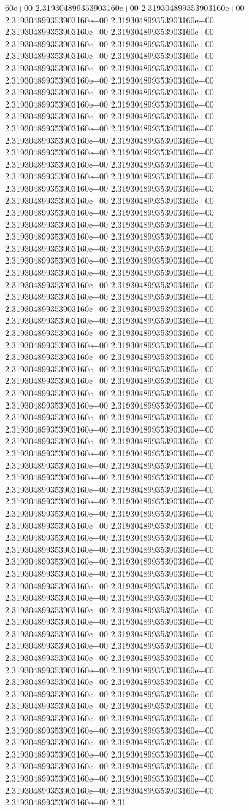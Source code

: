 60e+00	2.319304899353903160e+00	2.319304899353903160e+00	2.319304899353903160e+00	2.319304899353903160e+00	2.319304899353903160e+00	2.319304899353903160e+00	2.319304899353903160e+00	2.319304899353903160e+00	2.319304899353903160e+00	2.319304899353903160e+00	2.319304899353903160e+00	2.319304899353903160e+00	2.319304899353903160e+00	2.319304899353903160e+00	2.319304899353903160e+00	2.319304899353903160e+00	2.319304899353903160e+00	2.319304899353903160e+00	2.319304899353903160e+00	2.319304899353903160e+00	2.319304899353903160e+00	2.319304899353903160e+00	2.319304899353903160e+00	2.319304899353903160e+00	2.319304899353903160e+00	2.319304899353903160e+00	2.319304899353903160e+00	2.319304899353903160e+00	2.319304899353903160e+00	2.319304899353903160e+00	2.319304899353903160e+00	2.319304899353903160e+00	2.319304899353903160e+00	2.319304899353903160e+00	2.319304899353903160e+00	2.319304899353903160e+00	2.319304899353903160e+00	2.319304899353903160e+00	2.319304899353903160e+00	2.319304899353903160e+00	2.319304899353903160e+00	2.319304899353903160e+00	2.319304899353903160e+00	2.319304899353903160e+00	2.319304899353903160e+00	2.319304899353903160e+00	2.319304899353903160e+00	2.319304899353903160e+00	2.319304899353903160e+00	2.319304899353903160e+00	2.319304899353903160e+00	2.319304899353903160e+00	2.319304899353903160e+00	2.319304899353903160e+00	2.319304899353903160e+00	2.319304899353903160e+00	2.319304899353903160e+00	2.319304899353903160e+00	2.319304899353903160e+00	2.319304899353903160e+00	2.319304899353903160e+00	2.319304899353903160e+00	2.319304899353903160e+00	2.319304899353903160e+00	2.319304899353903160e+00	2.319304899353903160e+00	2.319304899353903160e+00	2.319304899353903160e+00	2.319304899353903160e+00	2.319304899353903160e+00	2.319304899353903160e+00	2.319304899353903160e+00	2.319304899353903160e+00	2.319304899353903160e+00	2.319304899353903160e+00	2.319304899353903160e+00	2.319304899353903160e+00	2.319304899353903160e+00	2.319304899353903160e+00	2.319304899353903160e+00	2.319304899353903160e+00	2.319304899353903160e+00	2.319304899353903160e+00	2.319304899353903160e+00	2.319304899353903160e+00	2.319304899353903160e+00	2.319304899353903160e+00	2.319304899353903160e+00	2.319304899353903160e+00	2.319304899353903160e+00	2.319304899353903160e+00	2.319304899353903160e+00	2.319304899353903160e+00	2.319304899353903160e+00	2.319304899353903160e+00	2.319304899353903160e+00	2.319304899353903160e+00	2.319304899353903160e+00	2.319304899353903160e+00	2.319304899353903160e+00	2.319304899353903160e+00	2.319304899353903160e+00	2.319304899353903160e+00	2.319304899353903160e+00	2.319304899353903160e+00	2.319304899353903160e+00	2.319304899353903160e+00	2.319304899353903160e+00	2.319304899353903160e+00	2.319304899353903160e+00	2.319304899353903160e+00	2.319304899353903160e+00	2.319304899353903160e+00	2.319304899353903160e+00	2.319304899353903160e+00	2.319304899353903160e+00	2.319304899353903160e+00	2.319304899353903160e+00	2.319304899353903160e+00	2.319304899353903160e+00	2.319304899353903160e+00	2.319304899353903160e+00	2.319304899353903160e+00	2.319304899353903160e+00	2.319304899353903160e+00	2.319304899353903160e+00	2.319304899353903160e+00	2.319304899353903160e+00	2.319304899353903160e+00	2.319304899353903160e+00	2.319304899353903160e+00	2.319304899353903160e+00	2.319304899353903160e+00	2.31